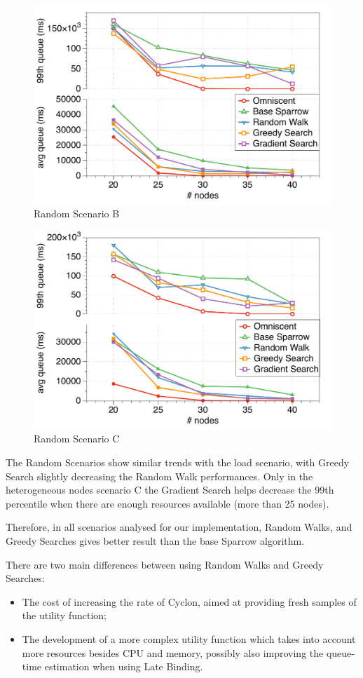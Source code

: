 \documentclass[conference]{IEEEtran}
\begin{document}
  \begin{figure}
  \begin{center}
  \includegraphics[width=.5\textwidth]{figures/randomB}
  \caption{Random Scenario B}
  \label{fig:comparison}
  \end{center}
  \end{figure}

  \begin{figure}
  \begin{center}
  \includegraphics[width=.5\textwidth]{figures/randomC}
  \caption{Random Scenario C}
  \label{fig:comparison}
  \end{center}
  \end{figure}


  The Random Scenarios show similar trends with the load scenario, with
  Greedy Search slightly decreasing the Random Walk performances. Only in
  the heterogeneous nodes scenario C the Gradient Search helps decrease
  the 99th percentile when there are enough resources available (more than
  25 nodes).
 
  Therefore, in all scenarios analysed for our implementation, Random
  Walks, and Greedy Searches gives better result than the base Sparrow
  algorithm.

  There are two main differences between using Random Walks and Greedy Searches:
  \begin{itemize}
    \item The cost of increasing the rate of Cyclon, aimed at providing
      fresh samples of the utility function;

    \item The development of a more complex utility function which takes
      into account more resources besides CPU and memory, possibly
      also improving the queue-time estimation when using Late Binding.
  \end{itemize}
\end{document}
